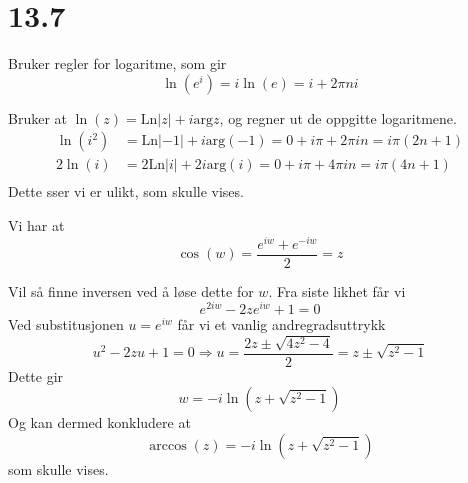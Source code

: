 \documentclass[11pt, a4paper, norsk]{NTNUoving}
\begin{document}
\section*{13.7}
\begin{oppgave}[15]
  Bruker regler for logaritme, som gir
  \[
    \ln(e^i) = i\ln(e) = i + 2\pi n i
  \]
\end{oppgave}
\begin{oppgave}[17]
  Bruker at $\ln(z)=\text{Ln}|z|+i\text{arg}z$, og regner ut de oppgitte logaritmene.
  \begin{align*}
    \ln(i^2) &= \text{Ln}|-1|+i\text{arg}(-1) = 0 + i\pi+2\pi i n = i\pi(2n+1) \\
    2\ln(i) &= 2\text{Ln}|i|+2i\text{arg}(i) = 0 + i\pi+4\pi i n = i\pi(4n+1) \\
  \end{align*}
  Dette sser vi er ulikt, som skulle vises.
\end{oppgave}
\begin{oppgave}[30]
  \begin{punkt}[a]
    Vi har at
    \[
      \cos(w) = \frac{e^{iw}+e^{-iw}}{2} = z
    \]
  
    Vil så finne inversen ved å løse dette for $w$. Fra siste likhet får vi
    \[
      e^{2iw}-2ze^{iw}+1=0
    \]
    Ved substitusjonen $u=e^{iw}$ får vi et vanlig andregradsuttrykk
    \[
      u^2-2zu+1 = 0 \Rightarrow u=\frac{2z\pm \sqrt{4z^2-4}}{2} = z\pm\sqrt{z^2-1}
    \]
    Dette gir
    \[
      w = -i\ln(z+\sqrt{z^2-1})
    \]
    Og kan dermed konkludere at
    \[
      \arccos(z) =  -i\ln(z+\sqrt{z^2-1})
    \]
    som skulle vises.
  \end{punkt}
\end{oppgave}
\end{document}
